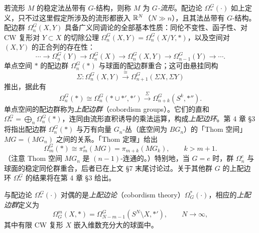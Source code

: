 若流形 $M$ 的稳定法丛带有 $G$-结构，则称 $M$ 为 \emph{$G$-流形}。配边论 $\Omega_*^G(\cdot)$ 如上定义，只不过这里假定所涉及的流形都嵌入 $\mathbb{R}^N$（$N\gg n$），且其法丛带有 $G$-结构。配边群 $\Omega_n^G(X,Y)$ 具备广义同调论的全部基本性质：同伦不变性、函子性、对 CW 复形对 $Y\subset X$ 的切除公理 $\Omega_n^G(X,Y)=\Omega_n^G(X/Y,*)$，以及空间对 $(X,Y)$ 的正合列的存在性：
\[
\cdots\to\Omega_n^G(Y)\to\Omega_n^G(X)\to\Omega_n^G(X,Y)\to\Omega_{n-1}^G(Y)\to\cdots.
\]
单点空间 $*$ 的配边群 $\Omega_n^G(*)$ 与球面的配边群重合；这可由悬挂同构
\[
\Sigma:\Omega_n^G(X,Y)\xrightarrow{\ \cong\ }\Omega_{n+1}^G(\Sigma X,\Sigma Y)
\]
推出，据此有
\[
\Omega_n^G(*)\cong\Omega_n^G(*\cup *',*')\xrightarrow{\ \Sigma\ }\Omega_{n+k}^G(S^k,*'').
\]
单点空间的配边群称为\emph{上配边群}（cobordism groups）。它们的直和 $\Omega_*^G=\bigoplus_n\Omega_n^G(*)$，连同由流形直积诱导的乘法运算，构成\emph{上配边环}。第 4 章 §3 将指出配边群 $\Omega_n^G(*)$ 与万有向量 $G_n$-丛（底空间为 $BG_n$）的「Thom 空间」$MG=(MG_n)$ 之间的关系。「Thom 定理」给出
\[
\Omega_m^G(*)\cong\pi_m^s(MG)=\pi_{m+k}(MG_k),\qquad k>m+1.
\]
（注意 Thom 空间 $MG_n$ 是 $(n-1)$-连通的。）特别地，当 $G=e$ 时，群 $\Omega_n^e$ 与球面的稳定同伦群重合，后者已在上文 §7 末尾讨论过。关于其他群 $G$ 的上配边环 $\Omega_*^G$ 的结果将在第 4 章 §3 给出。

与配边论 $\Omega_*^G(\cdot)$ 对偶的是\emph{上配边论}（cobordism theory）$\Omega_G^*(\cdot)$，相应的\emph{上配边群}定义为
\[
\Omega_G^m(X,*)=\Omega_{N-m-1}^G(S^N\setminus X,*'),\qquad N\to\infty,
\]
其中有限 CW 复形 $X$ 嵌入维数充分大的球面中。

